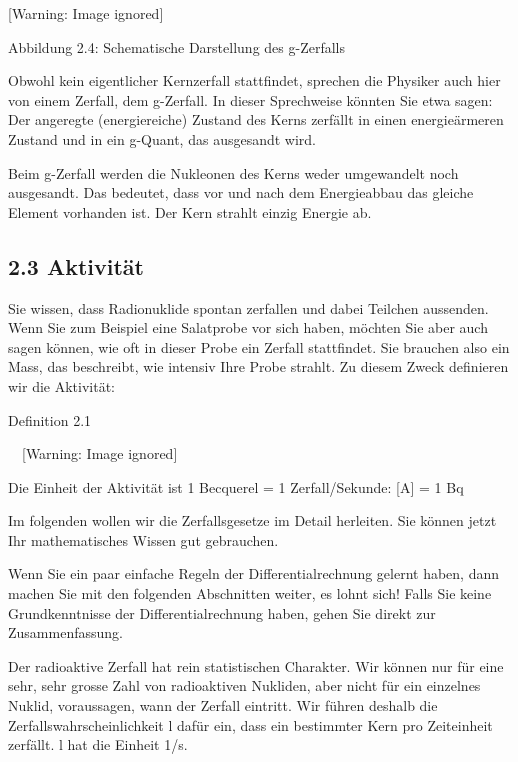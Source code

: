 \documentclass[12pt,a4paper,twoside]{article}
\begin{document}
  [Warning: Image ignored] %
 

Abbildung 2.4: Schematische Darstellung des \textgreek{g}\nobreakdash-Zerfalls

Obwohl kein eigentlicher Kernzerfall stattfindet, sprechen die Physiker auch hier von einem Zerfall, dem \textgreek{g}\nobreakdash-Zerfall. In dieser Sprechweise könnten Sie etwa sagen: {\quotedblbase}Der angeregte (energiereiche) Zustand des Kerns zerfällt in einen energieärmeren Zustand und in ein \textgreek{g}\nobreakdash-Quant, das ausgesandt wird{\quotedblbase}.

Beim \textgreek{g}\nobreakdash-Zerfall werden die Nukleonen des Kerns weder umgewandelt noch ausgesandt. Das bedeutet, dass vor und nach dem Energieabbau das gleiche Element vorhanden ist. Der Kern strahlt einzig Energie ab.


\bigskip

\subsection[2.3 Aktivität]{2.3 Aktivität}

\bigskip

Sie wissen, dass Radionuklide spontan zerfallen und dabei Teilchen aussenden. Wenn Sie zum Beispiel eine Salatprobe vor sich haben, möchten Sie aber auch sagen können, wie oft in dieser Probe ein Zerfall stattfindet. Sie brauchen also ein Mass, das beschreibt, wie intensiv Ihre Probe strahlt. Zu diesem Zweck definieren wir die Aktivität:

Definition 2.1

\ \   [Warning: Image ignored] %
 


\bigskip

Die Einheit der Aktivität ist 1 Becquerel = 1 Zerfall/Sekunde: [A] = 1 Bq

Im folgenden wollen wir die Zerfallsgesetze im Detail herleiten. Sie können jetzt Ihr mathematisches Wissen gut gebrauchen.

Wenn Sie ein paar einfache Regeln der Differentialrechnung gelernt haben, dann machen Sie mit den folgenden Abschnitten weiter, es lohnt sich! Falls Sie keine Grundkenntnisse der Differentialrechnung haben, gehen Sie direkt zur Zusammenfassung.

Der radioaktive Zerfall hat rein statistischen Charakter. Wir können nur für eine sehr, sehr grosse Zahl von radioaktiven Nukliden, aber nicht für ein einzelnes Nuklid, voraussagen, wann der Zerfall eintritt. Wir führen deshalb die Zerfallswahrscheinlichkeit l dafür ein, dass ein bestimmter Kern pro Zeiteinheit zerfällt. l hat die Einheit 1/s.
\end{document}
